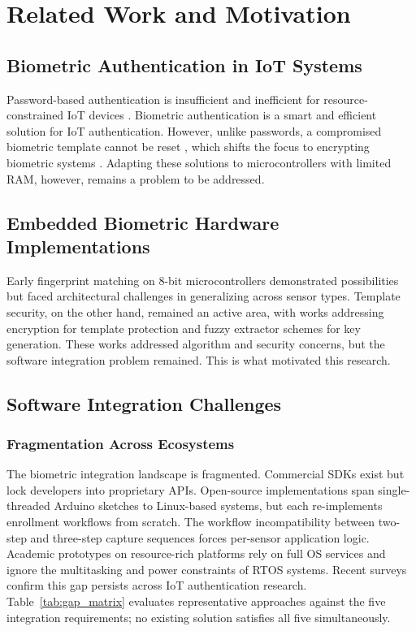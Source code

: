 \section{Related Work and Motivation}
\label{sec:related_work}

\subsection{Biometric Authentication in IoT Systems}
Password-based authentication is insufficient and inefficient for resource-constrained IoT devices \cite{alotaibi2025}. Biometric authentication is a smart and efficient solution for IoT authentication. However, unlike passwords, a compromised biometric template cannot be reset \cite{edge2024}, which shifts the focus to encrypting biometric systems \cite{biosec2020}. Adapting these solutions to microcontrollers with limited RAM, however, remains a problem to be addressed\cite{acm2023}.

\subsection{Embedded Biometric Hardware Implementations}
Early fingerprint matching on 8-bit microcontrollers demonstrated possibilities but faced architectural challenges in generalizing across sensor types\cite{fons2012biometrics}. Template security, on the other hand, remained an active area, with works addressing encryption for template protection\cite{murillo2015robust} and fuzzy extractor schemes for key generation\cite{tran2024biometrics}. These works addressed algorithm and security concerns, but the software integration problem remained. This is what motivated this research.

\subsection{Software Integration Challenges}
\subsubsection{Fragmentation Across Ecosystems}
The biometric integration landscape is fragmented. Commercial SDKs exist but lock developers into proprietary APIs. Open-source implementations span single-threaded Arduino sketches to Linux-based systems, but each re-implements enrollment workflows from scratch\cite{mayron2015biometric}. The workflow incompatibility between two-step and three-step capture sequences forces per-sensor application logic. Academic prototypes on resource-rich platforms rely on full OS services\cite{restuccia2018survey} and ignore the multitasking and power constraints of RTOS systems. Recent surveys confirm this gap persists across IoT authentication research\cite{ahvanooey2022modern,yang2021biometric}. Table~\ref{tab:gap_matrix} evaluates representative approaches against the five integration requirements; no existing solution satisfies all five simultaneously.


